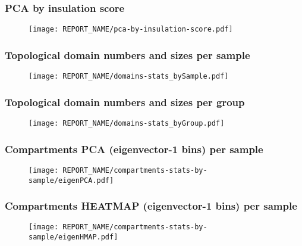 
\begin{frame}
\frametitle{PCA by insulation score}
\begin{figure}
\texttt{[image: REPORT\_NAME/pca-by-insulation-score.pdf]}
\end{figure}
\end{frame}

\begin{frame}											%
\frametitle{Topological domain numbers and sizes per sample}					%
\begin{figure}											%
\texttt{[image: REPORT\_NAME/domains-stats\_bySample.pdf]}			%
\end{figure}											%
\end{frame}											%

\begin{frame}											%
\frametitle{Topological domain numbers and sizes per group}					%
\begin{figure}											%
\texttt{[image: REPORT\_NAME/domains-stats\_byGroup.pdf]}			%
\end{figure}											%
\end{frame}											%

													
\begin{frame}														
\frametitle{Compartments PCA (eigenvector-1 bins) per sample}					
\begin{figure}												
\texttt{[image: REPORT\_NAME/compartments-stats-by-sample/eigenPCA.pdf]}
\end{figure}											
\end{frame}

												
\begin{frame}											
\frametitle{Compartments HEATMAP (eigenvector-1 bins) per sample}				
\begin{figure}											
\texttt{[image: REPORT\_NAME/compartments-stats-by-sample/eigenHMAP.pdf]}	
\end{figure}											
\end{frame}											

